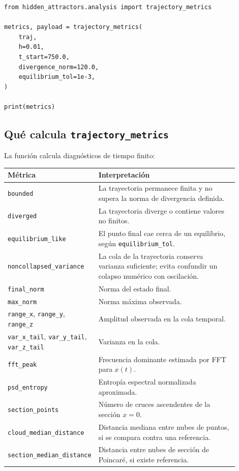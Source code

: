 \documentclass[11pt,letterpaper]{article}
\begin{document}
\begin{lstlisting}[style=python]
from hidden_attractors.analysis import trajectory_metrics

metrics, payload = trajectory_metrics(
    traj,
    h=0.01,
    t_start=750.0,
    divergence_norm=120.0,
    equilibrium_tol=1e-3,
)

print(metrics)
\end{lstlisting}

\subsection{Qué calcula \texttt{trajectory\_metrics}}

La función calcula diagnósticos de tiempo finito:

\begin{center}
\begin{tabular}{L{0.28\linewidth}L{0.62\linewidth}}
\toprule
Métrica & Interpretación \\
\midrule
\texttt{bounded} & La trayectoria permanece finita y no supera la norma de divergencia definida. \\
\texttt{diverged} & La trayectoria diverge o contiene valores no finitos. \\
\texttt{equilibrium\_like} & El punto final cae cerca de un equilibrio, según \texttt{equilibrium\_tol}. \\
\texttt{noncollapsed\_variance} & La cola de la trayectoria conserva varianza suficiente; evita confundir un colapso numérico con oscilación. \\
\texttt{final\_norm} & Norma del estado final. \\
\texttt{max\_norm} & Norma máxima observada. \\
\texttt{range\_x}, \texttt{range\_y}, \texttt{range\_z} & Amplitud observada en la cola temporal. \\
\texttt{var\_x\_tail}, \texttt{var\_y\_tail}, \texttt{var\_z\_tail} & Varianza en la cola. \\
\texttt{fft\_peak} & Frecuencia dominante estimada por FFT para $x(t)$. \\
\texttt{psd\_entropy} & Entropía espectral normalizada aproximada. \\
\texttt{section\_points} & Número de cruces ascendentes de la sección $x=0$. \\
\texttt{cloud\_median\_distance} & Distancia mediana entre nubes de puntos, si se compara contra una referencia. \\
\texttt{section\_median\_distance} & Distancia entre nubes de sección de Poincaré, si existe referencia. \\
\bottomrule
\end{tabular}
\end{center}
\end{document}

